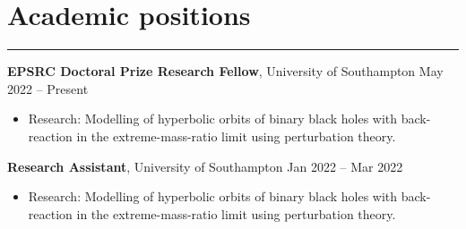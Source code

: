 \documentclass[10.5pt, oneside]{article}   	%
\begin{document}
 
 
\begin{center}
\huge
\href{mailto:O.F.Long@soton.ac.uk}{} \:
\textcolor{Orcidcolour}{\href{https://orcid.org/0000-0002-3897-9272}{}} \:
\textcolor{RGcolour}{\href{https://www.researchgate.net/profile/Oliver-Long-3}{}} \:
\textcolor{LIcolour}{\href{https://www.linkedin.com/in/oliverflong/}{}} \:
\href{https://scholar.google.com/citations?user=92pSUO0AAAAJ&hl=en}{} \:
\href{https://oliverlong.info}{}
\end{center}

 \vspace{1mm}


{\color{Sectioncolour}
\section*{Academic positions}
\vspace{-3mm}
\noindent\rule{\linewidth}{0.6pt}}

\textbf{EPSRC Doctoral Prize Research Fellow}, University of Southampton \hfill May 2022 -- Present \\
\vspace{-5mm}
\begin{itemize}
\item Research: Modelling of hyperbolic orbits of binary black holes with back-reaction in the extreme-mass-ratio limit using perturbation theory. 
\end{itemize}

\textbf{Research Assistant}, University of Southampton \hfill Jan 2022 -- Mar 2022 \\
\vspace{-5mm}
\begin{itemize}
\item Research: Modelling of hyperbolic orbits of binary black holes with back-reaction in the extreme-mass-ratio limit using perturbation theory. 
\end{itemize}
\end{document}
